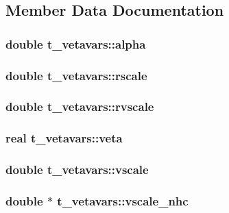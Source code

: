 \subsection{\-Member \-Data \-Documentation}
\hypertarget{structt__vetavars_a4b2316bb5d3b43b7593b3c5e85bf4598}{
\subsubsection[{alpha}]{\setlength{\rightskip}{0pt plus 5cm}double {\bf t\-\_\-vetavars\-::alpha}}}\label{structt__vetavars_a4b2316bb5d3b43b7593b3c5e85bf4598}
\hypertarget{structt__vetavars_a7082dee56613a50761687ff11209c46f}{
\subsubsection[{rscale}]{\setlength{\rightskip}{0pt plus 5cm}double {\bf t\-\_\-vetavars\-::rscale}}}\label{structt__vetavars_a7082dee56613a50761687ff11209c46f}
\hypertarget{structt__vetavars_ad7f04f0c653fd1a8b8a879c22bf718dd}{
\subsubsection[{rvscale}]{\setlength{\rightskip}{0pt plus 5cm}double {\bf t\-\_\-vetavars\-::rvscale}}}\label{structt__vetavars_ad7f04f0c653fd1a8b8a879c22bf718dd}
\hypertarget{structt__vetavars_a79f734722710e91d8a0d665de464c076}{
\subsubsection[{veta}]{\setlength{\rightskip}{0pt plus 5cm}real {\bf t\-\_\-vetavars\-::veta}}}\label{structt__vetavars_a79f734722710e91d8a0d665de464c076}
\hypertarget{structt__vetavars_a2fe480b09f4395ef7bebf4eedd459cf9}{
\subsubsection[{vscale}]{\setlength{\rightskip}{0pt plus 5cm}double {\bf t\-\_\-vetavars\-::vscale}}}\label{structt__vetavars_a2fe480b09f4395ef7bebf4eedd459cf9}
\hypertarget{structt__vetavars_a7017fbea56da900effc4100784b22894}{
\subsubsection[{vscale\-\_\-nhc}]{\setlength{\rightskip}{0pt plus 5cm}double $\ast$ {\bf t\-\_\-vetavars\-::vscale\-\_\-nhc}}}\label{structt__vetavars_a7017fbea56da900effc4100784b22894}


